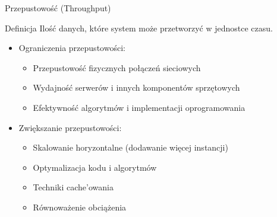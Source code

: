 \documentclass[aspectratio=169]{beamer}
\begin{document}
\begin{frame}{Przepustowość (Throughput)}
    \begin{block}{Definicja}
        Ilość danych, które system może przetworzyć w jednostce czasu.
    \end{block}
    
    \begin{itemize}
        \item Ograniczenia przepustowości:
        \begin{itemize}
            \item Przepustowość fizycznych połączeń sieciowych
            \item Wydajność serwerów i innych komponentów sprzętowych
            \item Efektywność algorytmów i implementacji oprogramowania
        \end{itemize}
        \vspace{0.3cm}
        \item Zwiększanie przepustowości:
        \begin{itemize}
            \item Skalowanie horyzontalne (dodawanie więcej instancji)
            \item Optymalizacja kodu i algorytmów
            \item Techniki cache'owania
            \item Równoważenie obciążenia
        \end{itemize}
    \end{itemize}
\end{frame}
\end{document}
